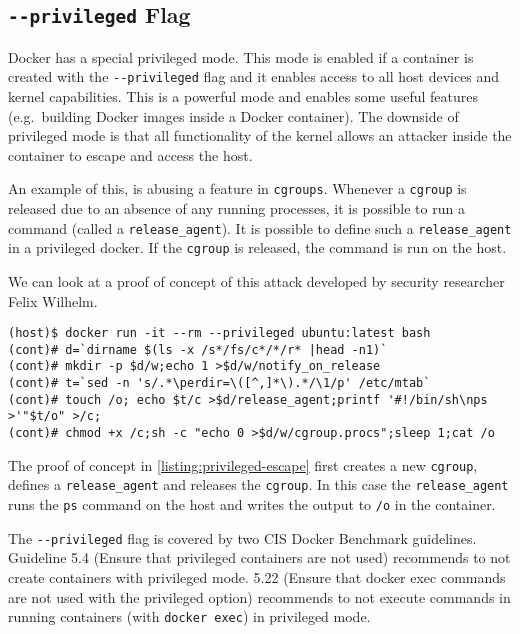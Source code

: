 \subsection{\texorpdfstring{\lstinline{--privileged}}{--privileged} Flag}\label{subsection:privileged}

Docker has a special privileged mode\cite{Docker-in-Docker-blog}. This mode is enabled if a container is created with the \lstinline{--privileged} flag and it enables access to all host devices and kernel capabilities. This is a powerful mode and enables some useful features (e.g.\ building Docker images inside a Docker container). The downside of privileged mode is that all functionality of the kernel allows an attacker inside the container to escape and access the host.

\medskip

An example of this, is abusing a feature in \lstinline{cgroups}\cite{CGroup-Docs}. Whenever a \lstinline{cgroup} is released due to an absence of any running processes, it is possible to run a command (called a \lstinline{release_agent}). It is possible to define such a \lstinline{release_agent} in a privileged docker. If the \lstinline{cgroup} is released, the command is run on the host\cite{TrailOfBits-Docker-Escape}.

\medskip

We can look at a proof of concept of this attack developed by security researcher Felix Wilhelm\cite{Felix-Wilhem-Tweet}.
\begin{lstlisting}[caption={Privileged container escape using \lstinline{cgroups}.},captionpos=b,label={listing:privileged-escape}]
(host)$ docker run -it --rm --privileged ubuntu:latest bash
(cont)# d=`dirname $(ls -x /s*/fs/c*/*/r* |head -n1)`
(cont)# mkdir -p $d/w;echo 1 >$d/w/notify_on_release
(cont)# t=`sed -n 's/.*\perdir=\([^,]*\).*/\1/p' /etc/mtab`
(cont)# touch /o; echo $t/c >$d/release_agent;printf '#!/bin/sh\nps >'"$t/o" >/c;
(cont)# chmod +x /c;sh -c "echo 0 >$d/w/cgroup.procs";sleep 1;cat /o
\end{lstlisting}

The proof of concept in \autoref{listing:privileged-escape} first creates a new \lstinline{cgroup}, defines a \lstinline{release_agent} and releases the \lstinline{cgroup}. In this case the \lstinline{release_agent} runs the \lstinline{ps} command on the host and writes the output to \lstinline{/o} in the container.

\medskip

The \lstinline{--privileged} flag is covered by two CIS Docker Benchmark guidelines. Guideline 5.4 (Ensure that privileged containers are not used) recommends to not create containers with privileged mode. 5.22 (Ensure that docker exec commands are not used with the privileged option) recommends to not execute commands in running containers (with \lstinline{docker exec}) in privileged mode.

